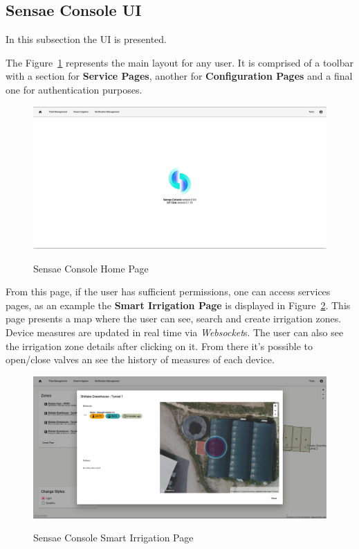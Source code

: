 \subsection{Sensae Console UI}
\label{subsec:implementation:description:ui}

In this subsection the \gls{UI} is presented.

The Figure~\ref{fig:implementation:description:ui:home} represents the main layout for any user. It is comprised of a toolbar with a section for \textbf{Service Pages}, another for \textbf{Configuration Pages} and a final one for authentication purposes.

\begin{figure}[H]
    \centering
    \resizebox{\columnwidth}{!}
    {
       \includegraphics{assets/figures/ui/home.png}
    }
    \caption[Sensae Console Home Page]{Sensae Console Home Page}
    \label{fig:implementation:description:ui:home}
\end{figure}

From this page, if the user has sufficient permissions, one can access services pages, as an example the \textbf{Smart Irrigation Page} is displayed in Figure~\ref{fig:implementation:description:ui:smartirrigation}.
This page presents a map where the user can see, search and create irrigation zones. Device measures are updated in real time via \textit{Websocket}s. The user can also see the irrigation zone details after clicking on it. From there it's possible to open/close valves an see the history of measures of each device. 

\begin{figure}[H]
    \centering
    \resizebox{\columnwidth}{!}
    {
       \includegraphics{assets/figures/ui/smart-irrigation.png}
    }
    \caption[Sensae Console Smart Irrigation Page]{Sensae Console Smart Irrigation Page}
    \label{fig:implementation:description:ui:smartirrigation}
\end{figure}

